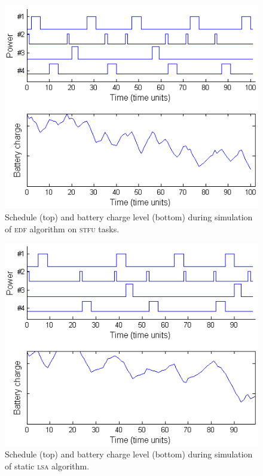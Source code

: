 \begin{figure}[tb]
\begin{center}
\includegraphics[scale=0.59]{edfstfubattery.png}
\caption{Schedule (top) and battery charge level (bottom) during simulation of \textsc{edf} algorithm on \textsc{stfu} tasks.\label{fig:edfstfubattery}}
\end{center}
\end{figure}

\begin{figure}[tb]
\begin{center}
\includegraphics[scale=0.59]{lsabattery.png}
\caption{Schedule (top) and battery charge level (bottom) during simulation of static \textsc{lsa} algorithm.\label{fig:lsabattery}}
\end{center}
\end{figure}


